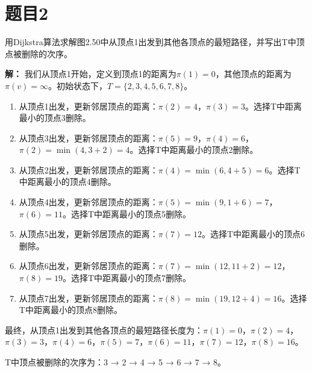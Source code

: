 \documentclass[utf8]{ctexart}
\theoremstyle{mystyle}
\begin{document}
\section*{题目2}
\begin{problembox}
    用Dijkstra算法求解图2.50中从顶点1出发到其他各顶点的最短路径，并写出T中顶点被删除的次序。
\end{problembox}
\textbf{解：} 我们从顶点1开始，定义到顶点1的距离为$\pi(1) = 0$，其他顶点的距离为$\pi(v) = \infty$。初始状态下，$T = \{2, 3, 4, 5, 6, 7, 8\}$。
\begin{enumerate}
    \item 从顶点1出发，更新邻居顶点的距离：$\pi(2) = 4$，$\pi(3) = 3$。选择T中距离最小的顶点3删除。
    \item 从顶点3出发，更新邻居顶点的距离：$\pi(5) = 9$，$\pi(4) = 6$，$\pi(2) = \min(4, 3 + 2) = 4$。选择T中距离最小的顶点2删除。
    \item 从顶点2出发，更新邻居顶点的距离：$\pi(4) = \min(6, 4 + 5) = 6$。选择T中距离最小的顶点4删除。
    \item 从顶点4出发，更新邻居顶点的距离：$\pi(5) = \min(9, 1 + 6) = 7$，$\pi(6) = 11$。选择T中距离最小的顶点5删除。
    \item 从顶点5出发，更新邻居顶点的距离：$\pi(7) = 12$。选择T中距离最小的顶点6删除。
    \item 从顶点6出发，更新邻居顶点的距离：$\pi(7) = \min(12, 11 + 2) = 12$，$\pi(8) = 19$。选择T中距离最小的顶点7删除。
    \item 从顶点7出发，更新邻居顶点的距离：$\pi(8) = \min(19, 12 + 4) = 16$。选择T中距离最小的顶点8删除。
\end{enumerate}
最终，从顶点1出发到其他各顶点的最短路径长度为：$\pi(1) = 0$，$\pi(2) = 4$，$\pi(3) = 3$，$\pi(4) = 6$，$\pi(5) = 7$，$\pi(6) = 11$，$\pi(7) = 12$，$\pi(8) = 16$。

T中顶点被删除的次序为：3 → 2 → 4 → 5 → 6 → 7 → 8。
\end{document}
